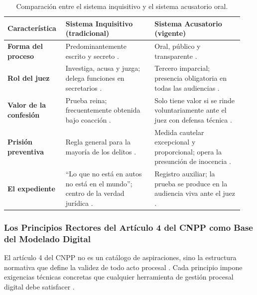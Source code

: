 \begin{table}[H]
  \centering
  \caption{Comparación entre el sistema inquisitivo y el sistema acusatorio oral.}
  \label{tab:inquisitivo-acusatorio}
  \begin{tabular}{@{}L{0.22\linewidth}L{0.36\linewidth}L{0.36\linewidth}@{}}
    \toprule
    \textbf{Característica} & \textbf{Sistema Inquisitivo (tradicional)} & \textbf{Sistema Acusatorio (vigente)} \\
    \midrule
    \textbf{Forma del proceso} & Predominantemente escrito y secreto \cite{agepuebla2020}. & Oral, público y transparente \cite{agepuebla2020}. \\
    \addlinespace
    \textbf{Rol del juez} & Investiga, acusa y juzga; delega funciones en secretarios \cite{lasalle2015}. & Tercero imparcial; presencia obligatoria en todas las audiencias \cite{lasalle2015}. \\
    \addlinespace
    \textbf{Valor de la confesión} & Prueba reina; frecuentemente obtenida bajo coacción \cite{agepuebla2020}. & Solo tiene valor si se rinde voluntariamente ante el juez con defensa técnica \cite{cnpp2021}. \\
    \addlinespace
    \textbf{Prisión preventiva} & Regla general para la mayoría de los delitos \cite{agepuebla2020}. & Medida cautelar excepcional y proporcional; opera la presunción de inocencia \cite{cnpp2021}. \\
    \addlinespace
    \textbf{El expediente} & ``Lo que no está en autos no está en el mundo''; centro de la verdad jurídica \cite{lasalle2015}. & Registro auxiliar; la prueba se produce en la audiencia viva ante el juez \cite{lasalle2015}. \\
    \bottomrule
  \end{tabular}
\end{table}

\subsubsection{Los Principios Rectores del Artículo 4 del CNPP como Base del Modelado Digital}

El artículo 4 del CNPP no es un catálogo de aspiraciones, sino la estructura normativa que define la validez de todo acto procesal \cite{cnpp2021}. Cada principio impone exigencias técnicas concretas que cualquier herramienta de gestión procesal digital debe satisfacer \cite{oaj2023ejusticia}.

